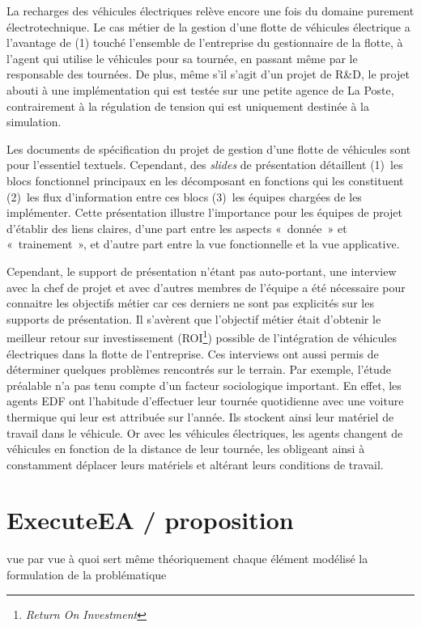La recharges des véhicules électriques relève encore une fois du domaine 
purement électrotechnique. Le cas métier de la gestion d'une flotte de véhicules 
électrique a l'avantage de (1) touché l'ensemble de l'entreprise du gestionnaire 
de la flotte, à l'agent qui utilise le véhicules pour sa tournée, en passant 
même par le responsable des tournées.
De plus, même s'il s'agit d'un projet de R\&D, le projet abouti à une 
implémentation qui est testée sur une petite agence de La Poste, contrairement à 
la régulation de tension qui est uniquement destinée à la simulation.

Les documents de spécification du projet de gestion d'une flotte de véhicules 
sont pour l'essentiel textuels. Cependant, des \textit{slides} de présentation 
détaillent (1)~les blocs fonctionnel principaux en les décomposant en fonctions 
qui les constituent (2)~les flux d'information entre ces blocs (3)~les équipes 
chargées de les implémenter. Cette présentation illustre l'importance pour les 
équipes  de projet d'établir des liens claires, d'une part entre les aspects 
«~donnée~» et «~trainement~», et d'autre part entre la vue fonctionnelle et la 
vue applicative.

Cependant, le support de présentation n'étant pas auto-portant, une interview 
avec la chef de projet et avec d'autres membres de l'équipe a été nécessaire 
pour connaitre les objectifs métier car ces derniers ne sont pas explicités sur 
les supports de présentation. Il s'avèrent que l'objectif métier était d'obtenir 
le meilleur retour sur investissement (ROI\footnote{\textit{Return On 
Investment}}) possible de l'intégration de véhicules électriques dans la flotte 
de l'entreprise. Ces interviews ont aussi permis de déterminer quelques 
problèmes rencontrés sur le terrain. Par exemple, l'étude préalable n'a pas tenu 
compte d'un facteur sociologique important. En effet, les agents EDF ont 
l'habitude d'effectuer leur tournée quotidienne avec une voiture thermique qui 
leur est attribuée sur l'année. Ils stockent ainsi leur matériel de travail dans 
le véhicule. Or avec les véhicules électriques, les agents changent de véhicules 
en fonction de la distance de leur tournée, les obligeant ainsi à constamment 
déplacer leurs matériels et altérant leurs conditions de travail.   

\section{ExecuteEA / proposition}
vue par vue 
à quoi sert même théoriquement chaque élément modélisé 
la formulation de la problématique 


